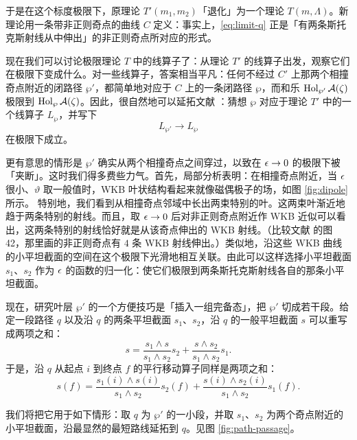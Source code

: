 于是在这个标度极限下，原理论 $T'(m_1, m_2)$「退化」为一个理论 $T(m, \Lambda)$。新理论用一条带非正则奇点的曲线 $C$ 定义：事实上，\eqref{eq:limit-q} 正是「有两条斯托克斯射线从中伸出」的非正则奇点所对应的形式。

现在我们可以讨论极限理论 $T$ 中的线算子了：从理论 $T'$ 的线算子出发，观察它们在极限下变成什么。对一些线算子，答案相当平凡：任何不经过 $C'$ 上那两个相撞奇点附近的闭路径 $\wp'$，都简单地对应于 $C$ 上的一条闭路径 $\wp$，而和乐 $\operatorname{Hol}_{\wp'} \mathcal{A}(\zeta)$ 极限到 $\operatorname{Hol}_\wp \mathcal{A}(\zeta)$。因此，很自然地可以延拓文献 \cite{Drukker:2009tz}：猜想 $\wp$ 对应于理论 $T'$ 中的一个线算子 $L_\wp$，并写下
\begin{equation}
 L_{\wp'} \to L_\wp
\end{equation}
在极限下成立。

更有意思的情形是 $\wp'$ 确实从两个相撞奇点之间穿过，以致在 $\epsilon \to 0$ 的极限下被「夹断」。这时我们得多费些力气。首先，局部分析表明：在相撞奇点附近，当 $\epsilon$ 很小、$\vartheta$ 取一般值时，WKB 叶状结构看起来就像磁偶极子的场，如图 \ref{fig:dipole} 所示。
特别地，我们看到从相撞奇点邻域中长出两束特别的叶。这两束叶渐近地趋于两条特别的射线。而且，取 $\epsilon \to 0$ 后对非正则奇点附近作 WKB 近似可以看出，这两条特别的射线恰好就是从该奇点伸出的 WKB 射线。（比较文献 \cite{Gaiotto:2009hg} 的图 42，那里画的非正则奇点有 $4$ 条 WKB 射线伸出。）类似地，沿这些 WKB 曲线的小平坦截面的空间在这个极限下光滑地相互关联。由此可以这样选择小平坦截面 $s_1$、$s_2$ 作为 $\epsilon$ 的函数的归一化：使它们极限到两条斯托克斯射线各自的那条小平坦截面。

现在，研究叶层 $\wp'$ 的一个方便技巧是「插入一组完备态」，把 $\wp'$ 切成若干段。给定一段路径 $q$ 以及沿 $q$ 的两条平坦截面 $s_1$、$s_2$，沿 $q$ 的一般平坦截面 $s$ 可以重写成两项之和：
\begin{equation}
 s = \frac{s_1 \wedge s}{s_1 \wedge s_2} s_2 + \frac{s \wedge s_2}{s_1 \wedge s_2} s_1.
\end{equation}
于是，沿 $q$ 从起点 $i$ 到终点 $f$ 的平行移动算子同样是两项之和：
\begin{equation}  \label{eq:two-terms}
 s(f) = \frac{s_1(i) \wedge s(i)}{s_1 \wedge s_2} s_2(f) + \frac{s(i) \wedge s_2(i)}{s_1 \wedge s_2} s_1(f).
\end{equation}

我们将把它用于如下情形：取 $q$ 为 $\wp'$ 的一小段，并取 $s_1$、$s_2$ 为两个奇点附近的小平坦截面，沿最显然的最短路线延拓到 $q$。见图 \ref{fig:path-passage}。

